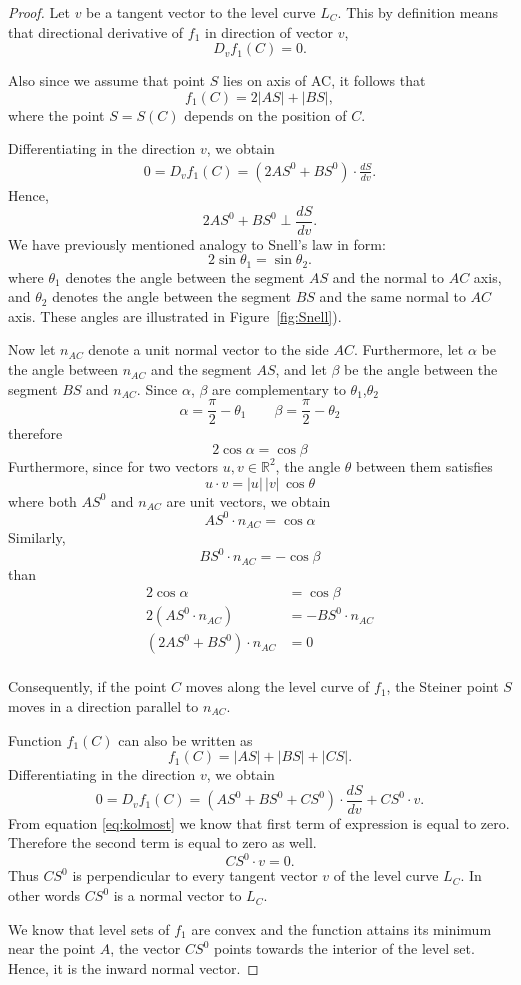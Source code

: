 \documentclass[openany]{book}
\begin{document}
	\begin{proof}
		Let \(v\) be a tangent vector to the level curve \(L_C\).
		This by definition means that directional derivative of \(f_1\) in direction of vector \(v\),
		\[
		D_v f_1(C)=0.
		\]
		
		Also since we assume that point \(S\) lies on axis of AC, it follows that
		\[
		f_1(C)=2|AS|+|BS|,
		\]   
		where the point \(S=S(C)\) depends on the position of \(C\).
		
		Differentiating in the direction \(v\), we obtain
		\begin{align}\label{eq:kolmost}
		0 = D_v f_1(C) = (2AS^0+BS^0)\cdot \frac{dS}{dv}.
		\end{align}
		Hence,
		\[
		2AS^0+BS^0 \perp \frac{dS}{dv}.
		\]
		We have previously mentioned analogy to Snell's law  in form:	
		\[
		2 \sin \theta_1 = \sin \theta_2.
		\] 
		where \(\theta_1\) denotes the angle between the segment \(AS\) and the normal to \(AC\) axis, and \(\theta_2\) denotes the angle between the segment \(BS\) and the same normal to \(AC\) axis.  These angles are illustrated in Figure~\ref{fig:Snell}).
		
		Now let \(n_{AC}\) denote a unit normal vector to the side \(AC\). Furthermore, let \(\alpha\) be the angle between \(n_{AC}\) and the segment \(AS\), and let \(\beta\) be the angle between the segment \(BS\) and \(n_{AC}\). Since  \(\alpha\), \(\beta\) are complementary to \(\theta_1\),\(\theta_2\) 
		\[
		\alpha=\frac{\pi}{2}-\theta_1
		\qquad
		\beta=\frac{\pi}{2}-\theta_2
		\]
		therefore
		\[
		2\cos\alpha=\cos\beta
		\]
		Furthermore, since for two vectors \(u,v \in \mathbb{R}^2\),
		the angle \(\theta\) between them satisfies
		\[
		u\cdot v = |u|\,|v|\,\cos\theta
		\]
		where both \(AS^0\) and \(n_{AC}\) are unit vectors, we obtain
		\[
		AS^0 \cdot n_{AC} = \cos\alpha
		\]
		Similarly,
		\[
		BS^0 \cdot n_{AC} = -\cos\beta
		\]
		than
		\begin{align*}
		2\cos\alpha&=\cos\beta \\
		2(AS^0\cdot n_{AC}) &=- BS^0\cdot n_{AC} \\
		(2AS^0+BS^0)\cdot n_{AC} &=0 \\
		\end{align*}
	
	Consequently, if the point \(C\) moves along the level curve of \(f_1\),
	the Steiner point \(S\) moves in a direction parallel to \(n_{AC}\).
		
		Function \(f_1(C)\) can also be written as
		\[
		f_1(C)=|AS|+|BS|+|CS|.
		\]
		Differentiating in the direction \(v\), we obtain
		\[
		0
		=
		D_v f_1(C)
		=
		(AS^0+BS^0+CS^0)\cdot\frac{dS}{dv}
		+
		CS^0\cdot v.
		\]
	From equation \ref{eq:kolmost} we know that first term of expression is equal to zero. Therefore the second term is equal to zero as well. 
	 	\[
	 	CS^0\cdot v=0.
	 	\]
	Thus \(CS^0\) is perpendicular to every tangent vector \(v\) of the level curve
	\(L_C\). In other words \(CS^0\) is a normal vector to \(L_C\).
	
	We know that level sets of \(f_1\) are convex and the function attains its minimum near the point \(A\), the
	vector \(CS^0\) points towards the interior of the level set. Hence, it is the inward normal vector.
	\end{proof}
\end{document}
